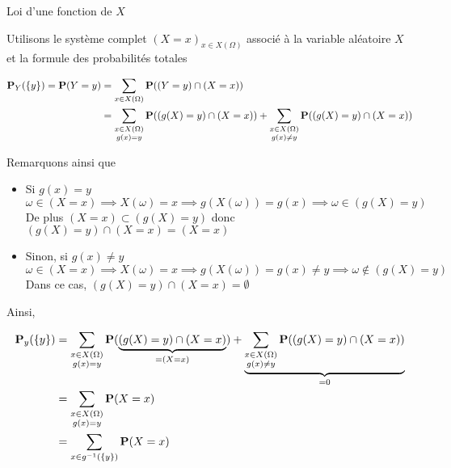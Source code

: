 \documentclass{article}
\renewenvironment{question_kholle}[2][ ]
{
	\subsection{\texorpdfstring{#2}{}}
	\notblank{#1}
	{
		\noindent #1
		\bigbreak
	}
	{}
	\begin{proof}
}
{
	\end{proof}
}
\begin{document}
\begin{question_kholle}[{
	Soit $X$ une variable alétoire sur $\Omega$ et $g$ une fonction définie sur $X(\Omega)$.
	La loi de probabilité $Y = g(X)$ est donnée par $Y(\Omega) = g(X(\Omega))$ et 
	$$
	\forall y \in Y(\Omega), \proba_{Y}(\{ y \})= \proba(Y=y) = \sum_{x \in g^{-1}(\{ y \})}\proba(X=x)= \sum_{\substack{x \in X(\Omega)\\ g(x)=y}}\proba(X=x)
	$$
	}]{Loi d'une fonction de $X$}
	
	Utilisons le système complet $(X = x)_{x \in X(\Omega)}$ associé à la variable aléatoire $X$ et la formule des probabilités totales
	
	\begin{align*}
		\mathbf P_{Y}(\{ y \}) = \mathbf P(Y=y) &= \sum_{x \in X(\Omega)}\mathbf P((Y=y) \cap (X=x)) \\
		&= \sum_{\substack{x \in X(\Omega)\\ g(x)=y}}\mathbf P((g(X)=y) \cap (X=x)) + \sum_{\substack{x \in X(\Omega)\\ g(x)\neq y}}\mathbf P((g(X)=y) \cap (X=x))
	\end{align*}
	
	
	Remarquons ainsi que
	\begin{itemize}[label=$\star$]
		\item Si $g(x) = y$
		$$
		\omega \in(X=x) \implies X(\omega)=x \implies g(X(\omega)) = g(x) \implies \omega \in (g(X) = y)
		$$
		De plus $(X = x) \subset (g(X)=y)$ donc $(g(X) = y) \cap(X=x)=(X=x)$
		
		\item Sinon, si $g(x) \neq y$
		$$
		\omega \in (X=x) \implies X(\omega) = x \implies g(X(\omega)) = g(x) \neq y \implies \omega \not\in (g(X) = y)
		$$
		Dans ce cas, $(g(X) = y) \cap (X = x) = \emptyset$
		
	\end{itemize}
	Ainsi, 
	
	\begin{align*}
		\mathbf P_{y}(\{ y \}) &= \sum_{\substack{x \in X(\Omega)\\ g(x)=y}}\mathbf P(\underbrace{ (g(X)=y) \cap (X=x) }_{ = (X=x) }) + \underbrace{ \sum_{\substack{x \in X(\Omega)\\ g(x)\neq y}}\mathbf P((g(X)=y) \cap (X=x)) }_{ =0 }\\
		&= \sum_{\substack{x \in X(\Omega)\\ g(x)=y}}\mathbf P(X=x) \\
		&= \sum_{x \in g^{-1}(\{ y \})}\mathbf P(X=x)
	\end{align*}
	
	
\end{question_kholle}
\end{document}
